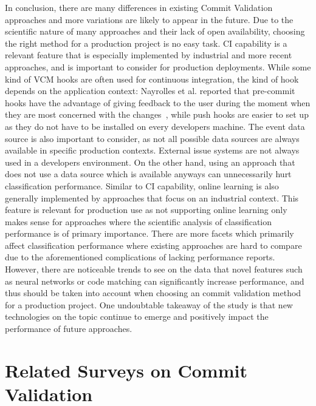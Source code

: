 In conclusion, there are many differences in existing Commit Validation approaches and more variations are likely to appear in the future. Due to the scientific nature of many approaches and their lack of open availability, choosing the right method for a production project is no easy task.
%
CI capability is a relevant feature that is especially implemented by industrial and more recent approaches, and is important to consider for production deployments. While some kind of VCM hooks are often used for continuous integration, the kind of hook depends on the application context: Nayrolles et al. reported that pre-commit hooks have the advantage of giving feedback to the user during the moment when they are most concerned with the changes~\cite{Nayrolles2018}, while push hooks are easier to set up as they do not have to be installed on every developers machine.
The event data source is also important to consider, as not all possible data sources are always available in specific production contexts. External issue systems are not always used in a developers environment.
On the other hand, using an approach that does not use a data source which is available anyways can unnecessarily hurt classification performance.
%
Similar to CI capability, online learning is also generally implemented by approaches that focus on an industrial context. This feature is relevant for production use as not supporting online learning only makes sense for approaches where the scientific analysis of classification performance is of primary importance.
%
%
There are more facets which primarily affect classification performance where existing approaches are hard to compare due to the aforementioned complications of lacking performance reports. However, there are noticeable trends to see on the data that novel features such as neural networks or code matching can significantly increase performance, and thus should be taken into account when choosing an commit validation method for a production project. One undoubtable takeaway of the study is that new technologies on the topic continue to emerge and positively impact the performance of future approaches. 



\section{Related Surveys on Commit Validation}
\label{sec:relatedsurveys}

